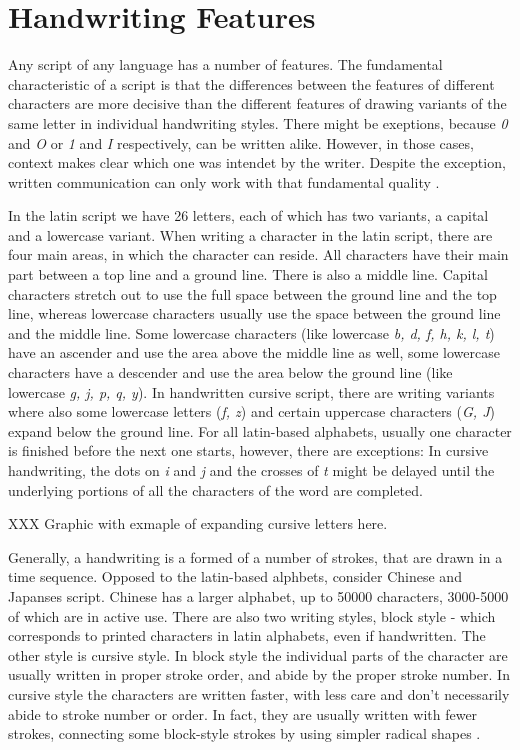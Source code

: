 \section{Handwriting Features}
\label{sec:handwritingfeatures}

Any script of any language has a number of features. The fundamental 
characteristic of a script is that the differences between the features
of different characters are more decisive than the different features of 
drawing variants of the same letter in individual handwriting styles.
There might be exeptions, because \emph{0} and \emph{O} or \emph{1} and 
\emph{I} respectively, can be written alike. However, in those cases, 
context makes clear which one was intendet by the writer.
Despite the exception, written communication can only work with that
fundamental quality .

In the latin script we have 26 letters, each of which has two variants, 
a capital and a lowercase variant. When writing a character 
in the latin script, there are four main areas, in which the character 
can reside. All characters have their main part between a top line and a 
ground line. There is also a middle line. Capital characters stretch out to use
the full space between the ground line and the top line, whereas lowercase 
characters usually use the space between the ground line and the middle line.
Some lowercase characters (like lowercase \emph{b, d, f, h, k, l, t}) have an
ascender and use the area above the middle line as well, 
some lowercase characters have a descender and use the area below the ground 
line (like lowercase \emph{g, j, p, q, y}). In handwritten cursive script, 
there are writing variants where also some lowercase letters (\emph{f, z}) and
certain uppercase characters (\emph{G, J}) expand below the ground line.
For all latin-based alphabets, usually one character is finished before the 
next one starts, however, there are exceptions:
In cursive handwriting, the dots on \emph{i} and \emph{j} and the crosses
of \emph{t} might be delayed until the underlying portions of all 
the characters of the word are completed. 

XXX Graphic with exmaple of expanding cursive letters here.

Generally, a handwriting is a formed of a number of strokes, that are drawn
in a time sequence. Opposed to the latin-based alphbets, consider Chinese and
Japanses script. Chinese has a larger alphabet, up to 50000 characters, 
3000-5000 of which are in active use. There are also two writing styles,
block style - which corresponds to printed characters in latin alphabets,
even if handwritten. The other style is cursive style. In block style the
individual parts of the character are usually written in proper stroke order,
and abide by the proper stroke number. In cursive style the characters are
written faster, with less care and don't necessarily abide to stroke
number or order. In fact, they are usually written with fewer strokes,
connecting some block-style strokes by using simpler radical 
shapes .

